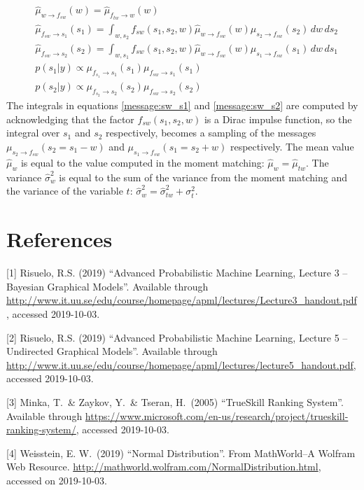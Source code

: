 \documentclass{article}
\begin{document}
\begin{subequations}
\begin{align}
		& \hat{\mu}_{w\rightarrow f_{sw}}(w) = \hat{\mu}_{f_{tw}\rightarrow w}(w)\\
		& \hat{\mu}_{f_{sw}\rightarrow s_1}(s_1) = \int_{w, s_2}f_{sw}(s_1,s_2,w)\hat{\mu}_{w\rightarrow f_{sw}}(w)\mu_{s_2\rightarrow f_{sw}}(s_2)\,dw\,ds_2 \label{message:sw_s1}\\
		& \hat{\mu}_{f_{sw}\rightarrow s_2}(s_2) = \int_{w, s_1}f_{sw}(s_1,s_2,w)\hat{\mu}_{w\rightarrow f_{sw}}(w)\mu_{s_1\rightarrow f_{sw}}(s_1)\,dw\,ds_1 \label{message:sw_s2}\\
		&p(s_1|y) \propto \mu_{f_{s_1}\rightarrow s_1}(s_1)\mu_{f_{sw}\rightarrow s_1}(s_1)\\
		&p(s_2|y) \propto \mu_{f_{s_2}\rightarrow s_2}(s_2)\mu_{f_{sw}\rightarrow s_2}(s_2)
		\end{align}
	\end{subequations}
	The integrals in equations \eqref{message:sw_s1} and \eqref{message:sw_s2} are computed by acknowledging that the factor $ f_{sw}(s_1,s_2,w) $ is a Dirac impulse function, so the integral over $ s_1 $ and $ s_2 $ respectively, becomes a sampling of the messages $ \mu_{s_2\rightarrow f_{sw}}(s_2=s_1-w) $ and $ \mu_{s_1\rightarrow f_{sw}}(s_1=s_2+w) $ respectively.
	The mean value $\hat{\mu}_w$ is equal to the value computed in the moment matching: $ \hat{\mu}_w = \hat{\mu}_{tw} $.
	The variance $ \hat{\sigma}_w^2 $ is equal to the sum of the variance from the moment matching and the variance of the variable $ t $: $ \hat{\sigma}_w^2=\hat{\sigma}_{tw}^2+\sigma_t^2 $.



	\section*{References}

	\small
	[1] Risuelo, R.S. (2019) ``Advanced Probabilistic Machine Learning, Lecture 3 – Bayesian Graphical Models''. Available through \url{http://www.it.uu.se/edu/course/homepage/apml/lectures/Lecture3_handout.pdf}, accessed 2019-10-03.
	
	[2] Risuelo, R.S. (2019) ``Advanced Probabilistic Machine Learning, Lecture 5 – Undirected Graphical Models''. Available through \url{http://www.it.uu.se/edu/course/homepage/apml/lectures/lecture5_handout.pdf}, accessed 2019-10-03.
	
	[3] Minka, T.\ \& Zaykov, Y.\ \& Tseran, H.\ (2005)  ``TrueSkill Ranking System''. Available through \url{https://www.microsoft.com/en-us/research/project/trueskill-ranking-system/}, accessed 2019-10-03.
	
	[4] Weisstein, E. W.\ (2019) ``Normal Distribution''. From MathWorld--A Wolfram Web Resource. \url{http://mathworld.wolfram.com/NormalDistribution.html}, accessed on 2019-10-03.
	
\end{document}
